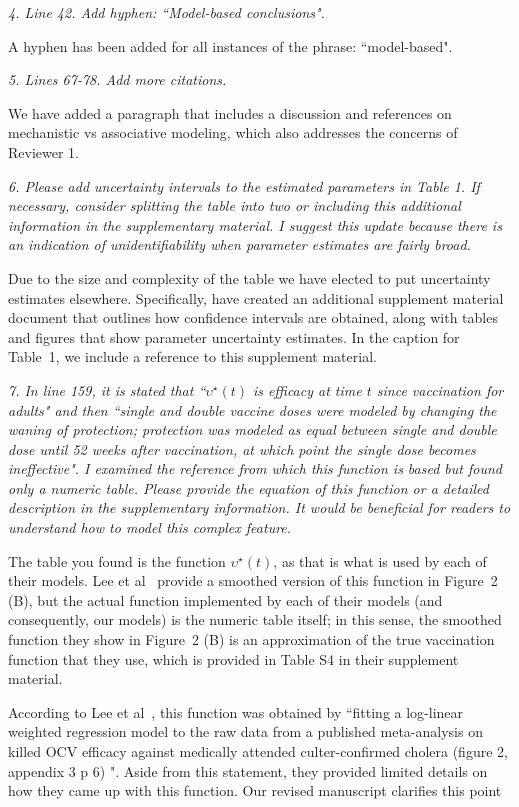 \documentclass[11pt]{article}
\newcommand\report[1]{{\color{mygreen} \vspace{1mm}\hspace{0.25in}\parbox{6in}{\em #1}}}
\newcommand\article[1]{{\color{blue} \vspace{1mm}\hspace{0.25in}\parbox{6in}{\em #1}}}
\begin{document}
\report{
  4. Line 42. Add hyphen: ``Model-based conclusions".
}

A hyphen has been added for all instances of the phrase: ``model-based".

\report{
  5. Lines 67-78. Add more citations.
}

We have added a paragraph that includes a discussion and references on mechanistic vs associative modeling, which also addresses the concerns of Reviewer 1. 

\article{\editMechModels}

\report{
  6. Please add uncertainty intervals to the estimated parameters in Table 1. If necessary, consider splitting the table into two or including this additional information in the supplementary material. I suggest this update because there is an indication of unidentifiability when parameter estimates are fairly broad.
}

Due to the size and complexity of the table we have elected to put uncertainty estimates elsewhere. Specifically, have created an additional supplement material document that outlines how confidence intervals are obtained, along with tables and figures that show parameter uncertainty estimates. In the caption for Table~1, we include a reference to this supplement material. 

\report{
  7. In line 159, it is stated that ``$\upsilon^\star(t)$ is efficacy at time $t$ since vaccination for adults" and then ``single and double vaccine doses were modeled by changing the waning of protection; protection was modeled as equal between single and double dose until 52 weeks after vaccination, at which point the single dose becomes ineffective". I examined the reference from which this function is based but found only a numeric table. Please provide the equation of this function or a detailed description in the supplementary information. It would be beneficial for readers to understand how to model this complex feature.
}

The table you found is the function $\upsilon^\star(t)$, as that is what is used by each of their models. Lee et al~\cite{lee20} provide a smoothed version of this function in Figure~2 (B), but the actual function implemented by each of their models (and consequently, our models) is the numeric table itself; in this sense, the smoothed function they show in Figure~2 (B) is an approximation of the true vaccination function that they use, which is provided in Table S4 in their supplement material.

According to Lee et al~\cite{lee20}, this function was obtained by ``fitting a log-linear weighted regression model to the raw data from a published meta-analysis on killed OCV efficacy against medically attended culter-confirmed cholera (figure 2, appendix 3 p 6) \cite{bi17}". Aside from this statement, they provided limited details on how they came up with this function. Our revised manuscript clarifies this point
\end{document}
